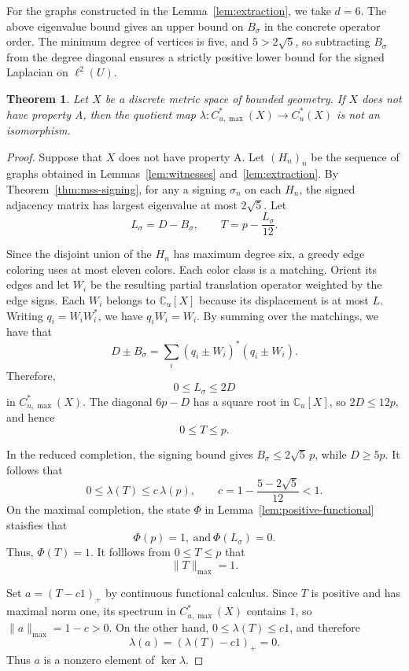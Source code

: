 \documentclass[11pt,a4paper]{article}
\newtheorem{theorem}{Theorem}[section]
\theoremstyle{definition}\newtheorem{definition}[theorem]{Definition}
\theoremstyle{remark}\newtheorem{remark}[theorem]{Remark}
\newcommand{\C}{\mathbb C}
\newcommand{\Cu}{C_u^*}
\newcommand{\Cum}{C_{u,\max}^*}
\newcommand{\norm}[1]{\lVert#1\rVert}
\begin{document}
For the graphs constructed in the Lemma~\ref{lem:extraction}, we take $d=6$.
The above eigenvalue bound gives an upper bound on $B_\sigma$
in the concrete operator order. The minimum degree of vertices is five, and
$5>2\sqrt5$, so subtracting $B_\sigma$ from the degree diagonal ensures
a strictly positive lower bound for the signed Laplacian on
$\ell^2(U)$. 

\begin{theorem}\label{thm:converse}
Let $X$ be a discrete metric space of bounded geometry. If $X$ does not
have property A, then the quotient map
$\lambda:\Cum(X)\to\Cu(X)$ is not an isomorphism.
\end{theorem}
\begin{proof}
Suppose that $X$ does not have property A. Let $(H_n)_n$ be the sequence of graphs obtained in Lemmas~\ref{lem:witnesses}
and~\ref{lem:extraction}. By Theorem~\ref{thm:mss-signing}, for any a signing
$\sigma_n$ on each $H_n$, the signed adjacency matrix has largest
eigenvalue at most $2\sqrt5$. Let
$$
L_\sigma=D-B_\sigma,\qquad T=p-\frac{L_\sigma}{12}.
$$

Since the disjoint union of the $H_n$ has maximum degree six,
a greedy edge coloring uses at most eleven colors. Each color
class is a matching. Orient its edges and let $W_i$ be the resulting
partial translation operator weighted by the edge signs. Each
$W_i$ belongs to $\C_u[X]$ because its displacement is at most $L$.
Writing $q_i=W_iW_i^*$, we have $q_iW_i=W_i$. By summing over the
matchings, we have that
$$
D\pm B_\sigma
=\sum_i(q_i\pm W_i)^*(q_i\pm W_i).
$$
Therefore, $$0\le L_\sigma\le 2D$$ 
in $\Cum(X)$. The diagonal $6p-D$
has a square root in $\C_u[X]$, so $2D\le12p$, and hence
$$0\le T\le p.$$

In the reduced completion, the signing bound gives
$B_\sigma\le 2\sqrt5\,p$, while $D\ge5p$. It follows that
$$
0\le\lambda(T)\le c\,\lambda(p),
\qquad c=1-\frac{5-2\sqrt5}{12}<1.
$$
On the maximal completion, the state $\Phi$ in Lemma~\ref{lem:positive-functional} staisfies that 
$$\Phi(p)=1,~ \mbox{and}~\Phi(L_\sigma)=0.$$
Thus, $\Phi(T)=1$. It folllows from $0\le T\le p$ that 
$$\norm{T}_{\max}=1.$$

Set $a=(T-c1)_+$ by continuous functional calculus. Since $T$ is
positive and has maximal norm one, its spectrum in $\Cum(X)$
contains $1$, so $\norm{a}_{\max}=1-c>0$. On the other hand,
$0\le\lambda(T)\le c1$, and therefore
$$
\lambda(a)=(\lambda(T)-c1)_+=0.
$$
Thus $a$ is a nonzero element of $\ker\lambda$.
\end{proof}
\end{document}
